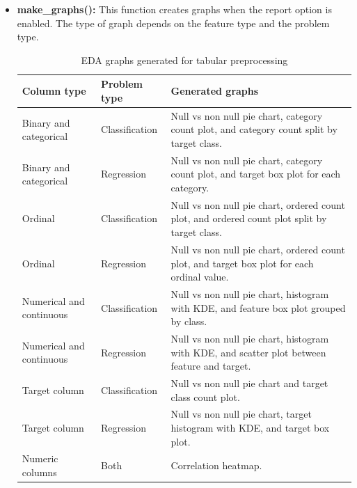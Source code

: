 \documentclass[12pt,a4paper]{report}
\begin{document}
\begin{itemize}
\begin{table}[!htbp]
\begin{tabularx}{\textwidth}{p{}X p{}}
    \end{tabularx}
    \renewcommand{\arraystretch}{1.0}
    \end{table}



    \item \textbf{make\_graphs():}
    This function creates graphs when the report option is enabled. The type of graph
    depends on the feature type and the problem type.
    \Needspace{0.58\textheight}
    \begin{table}[!htbp]
      \centering
      \small
      \caption{EDA graphs generated for tabular preprocessing}
      \label{tab:tabular-eda-graphs}
      \renewcommand{\arraystretch}{1.08}
      \begin{tabularx}{\textwidth}{p{}p{}X}
      \hline
      \textbf{Column type} & \textbf{Problem type} & \textbf{Generated graphs} \\
      \hline
      Binary and categorical & Classification & Null vs non null pie chart,
      category count plot, and category count split by target class. \\
      \hline
      Binary and categorical & Regression & Null vs non null pie chart, category
      count plot, and target box plot for each category. \\
      \hline
      Ordinal & Classification & Null vs non null pie chart, ordered count plot, and
      ordered count plot split by target class. \\
      \hline
      Ordinal & Regression & Null vs non null pie chart, ordered count plot, and
      target box plot for each ordinal value. \\
      \hline
      Numerical and continuous & Classification & Null vs non null pie chart,
      histogram with KDE, and feature box plot grouped by class. \\
      \hline
      Numerical and continuous & Regression & Null vs non null pie chart, histogram
      with KDE, and scatter plot between feature and target. \\
      \hline
      Target column & Classification & Null vs non null pie chart and target class
      count plot. \\
      \hline
      Target column & Regression & Null vs non null pie chart, target histogram with
      KDE, and target box plot. \\
      \hline
      Numeric columns & Both & Correlation heatmap. \\
      \hline
      \end{tabularx}
      \normalsize
      \renewcommand{\arraystretch}{1.0}
      \end{table}


\end{itemize}
\end{document}
